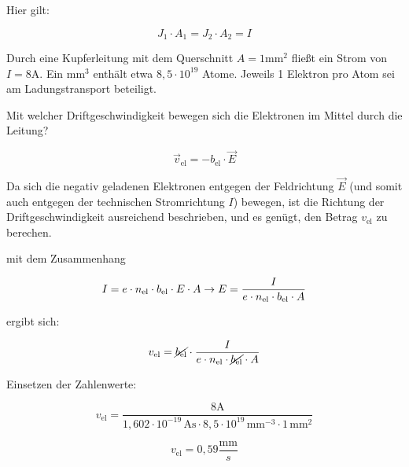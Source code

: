 {Hier gilt:

\begin{equation*}
	J_1 \cdot A_1 = J_2 \cdot A_2 = I
\end{equation*}





\begin{bsp}{}{}

	Durch eine Kupferleitung mit dem Querschnitt $A = 1 \mathrm{mm}^2$ fließt ein Strom von $I = 8 \mathrm{A}$. 
	Ein $\mathrm{mm}^3$ enthält etwa $ 8,5 \cdot 10^{19}$ Atome. Jeweils 1 Elektron pro Atom sei am Ladungstransport beteiligt.

	
	Mit welcher Driftgeschwindigkeit bewegen sich die Elektronen im Mittel durch die Leitung?

	\begin{equation*}
		\vec{v}_\mathrm{el} = - b_\mathrm{el} \cdot \vec{E}
	\end{equation*}

	Da sich die negativ geladenen Elektronen entgegen der Feldrichtung $\vec{E}$ (und somit auch entgegen der
	 technischen Stromrichtung $I$) bewegen, ist die Richtung der Driftgeschwindigkeit ausreichend beschrieben,
	 und es genügt, den Betrag $v_\mathrm{el}$ zu berechen.


	mit dem Zusammenhang

	\begin{equation*}
	 I = e \cdot n_\mathrm{el} \cdot b_\mathrm{el} \cdot E  \cdot A\\
\rightarrow E = \frac{I}{e \cdot n_\mathrm{el} \cdot b_\mathrm{el} \cdot A}
	\end{equation*}

	

	ergibt sich:

\begin{equation*}
	v_\mathrm{el} = \cancel{b_\mathrm{el}} \cdot \frac{I}{e \cdot n_\mathrm{el} \cdot \cancel{b_\mathrm{el}} \cdot A}
\end{equation*}	

Einsetzen der Zahlenwerte:

\begin{equation*}
	v_\mathrm{el} = \frac{8 \mathrm{A}}{1,602 \cdot 10^{-19} \, \mathrm{As} \cdot 8,5 \cdot 10^{19} \, \mathrm{mm}^{-3} \cdot 1 \, \mathrm{mm}^2 }
\end{equation*}	


\begin{equation*}
	v_\mathrm{el} = 0,59 \frac{\mathrm{mm}}{s} 
\end{equation*}	


\end{bsp}}
